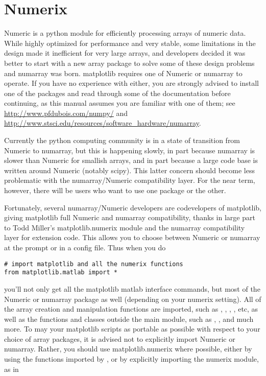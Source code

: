 \documentclass[]{book}
\begin{document}
\section{Numerix}
\label{sec:numerix}

Numeric is a python module for efficiently processing arrays of
numeric data.  While highly optimized for performance and very stable,
some limitations in the design made it inefficient for very large
arrays, and developers decided it was better to start with a new array
package to solve some of these design problems and numarray was born.
matplotlib requires one of Numeric or numarray to operate.  If you
have no experience with either, you are strongly advised to install
one of the packages and read through some of the documentation before
continuing, as this manual assumes you are familiar with one of them;
see \url{http://www.pfdubois.com/numpy/} and
\url{http://www.stsci.edu/resources/software_hardware/numarray}.

Currently the python computing community is in a state of transition
from Numeric to numarray, but this is happening slowly, in part
because numarray is slower than Numeric for smallish arrays, and in
part because a large code base is written around Numeric (notably
scipy).  This latter concern should become less problematic with the
numarray/Numeric compatibility layer.  For the near term, however,
there will be users who want to use one package or the other.

Fortunately, several numarray/Numeric developers are codevelopers of
matplotlib, giving matplotlib full Numeric and numarray compatibility,
thanks in large part to Todd Miller's matplotlib.numerix module and
the numarray compatibility layer for extension code.  This allows you
to choose between Numeric or numarray at the prompt or in a config
file.  Thus when you do

\begin{lstlisting}
# import matplotlib and all the numerix functions
from matplotlib.matlab import *
\end{lstlisting}

\noindent you'll not only get all the matplotlib matlab interface
commands, but most of the Numeric or numarray package as well
(depending on your numerix setting).  All of the array creation and
manipulation functions are imported, such as ,
, , , etc, as well as the
functions and classes outside the main module, such as ,
,  and much more.  To may your matplotlib
scripts as portable as possible with respect to your choice of array
packages, it is advised not to explicitly import Numeric or numarray.
Rather, you should use matplotlib.numerix where possible, either by
using the functions imported by , or by
explicitly importing the numerix module, as in 
\end{document}
